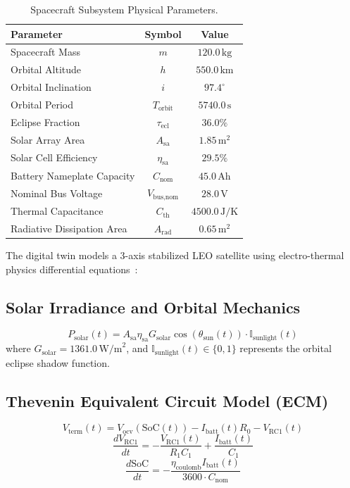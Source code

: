 \documentclass[conference]{IEEEtran}
\begin{document}
\begin{table}[t]
\centering
\caption{Spacecraft Subsystem Physical Parameters.}
\label{tab:params}
\small
\setlength{\tabcolsep}{6pt}
\renewcommand{\arraystretch}{1.15}
\begin{tabular}{lcc}
\toprule
\textbf{Parameter} & \textbf{Symbol} & \textbf{Value} \\
\midrule
Spacecraft Mass & $m$ & $120.0\,\text{kg}$ \\
Orbital Altitude & $h$ & $550.0\,\text{km}$ \\
Orbital Inclination & $i$ & $97.4^\circ$ \\
Orbital Period & $T_{\text{orbit}}$ & $5740.0\,\text{s}$ \\
Eclipse Fraction & $\tau_{\text{ecl}}$ & $36.0\%$ \\
Solar Array Area & $A_{\text{sa}}$ & $1.85\,\text{m}^2$ \\
Solar Cell Efficiency & $\eta_{\text{sa}}$ & $29.5\%$ \\
Battery Nameplate Capacity & $C_{\text{nom}}$ & $45.0\,\text{Ah}$ \\
Nominal Bus Voltage & $V_{\text{bus,nom}}$ & $28.0\,\text{V}$ \\
Thermal Capacitance & $C_{\text{th}}$ & $4500.0\,\text{J/K}$ \\
Radiative Dissipation Area & $A_{\text{rad}}$ & $0.65\,\text{m}^2$ \\
\bottomrule
\end{tabular}
\end{table}

The digital twin models a 3-axis stabilized LEO satellite using electro-thermal physics differential equations~\cite{chen2012thevenin, wertz2011space}:

\subsection{Solar Irradiance and Orbital Mechanics}
\begin{equation}
P_{\text{solar}}(t) = A_{\text{sa}} \eta_{\text{sa}} G_{\text{solar}} \cos(\theta_{\text{sun}}(t)) \cdot \mathbb{I}_{\text{sunlight}}(t)
\end{equation}
where $G_{\text{solar}} = 1361.0\,\text{W/m}^2$, and $\mathbb{I}_{\text{sunlight}}(t) \in \{0, 1\}$ represents the orbital eclipse shadow function.

\subsection{Thevenin Equivalent Circuit Model (ECM)}
\begin{equation}
V_{\text{term}}(t) = V_{\text{ocv}}(\text{SoC}(t)) - I_{\text{batt}}(t) R_0 - V_{\text{RC1}}(t)
\end{equation}
\begin{equation}
\frac{dV_{\text{RC1}}}{dt} = -\frac{V_{\text{RC1}}(t)}{R_1 C_1} + \frac{I_{\text{batt}}(t)}{C_1}
\end{equation}
\begin{equation}
\frac{d\text{SoC}}{dt} = -\frac{\eta_{\text{coulomb}} I_{\text{batt}}(t)}{3600 \cdot C_{\text{nom}}}
\end{equation}
\end{document}
